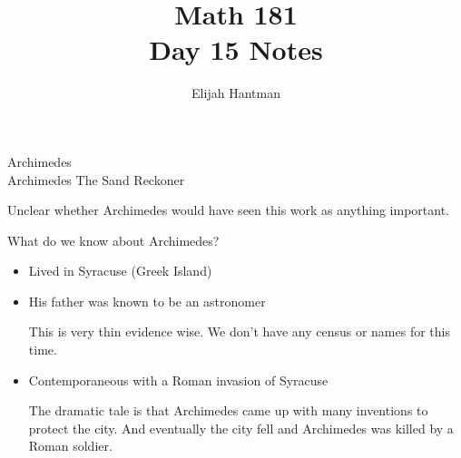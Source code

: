 \documentclass{report}
\title{\Huge{Math 181}\\Day 15 Notes}
\author{\huge{Elijah Hantman}}
\date{}
\begin{document}
\maketitle
\newpage

\begin{description}
    \item {\large Archimedes}\\ 
        Archimedes The Sand Reckoner
        \begin{mdframed}
            Unclear whether Archimedes would have seen
            this work as anything important.
        \end{mdframed}
    \item {\large What do we know about Archimedes?}
        \begin{mdframed}
            \begin{itemize}
                \item Lived in Syracuse (Greek Island)
                \item His father was known to be an astronomer
                    \begin{mdframed}
                        This is very thin evidence wise.
                        We don't have any census or names
                        for this time.
                    \end{mdframed}
                \item Contemporaneous with a Roman invasion
                    of Syracuse
                    \begin{mdframed}
                        The dramatic tale is that Archimedes
                        came up with many inventions to protect
                        the city. And eventually the city fell
                        and Archimedes was killed by a Roman
                        soldier.


\end{mdframed}
\end{itemize}
\end{mdframed}
\end{description}
\end{document}
